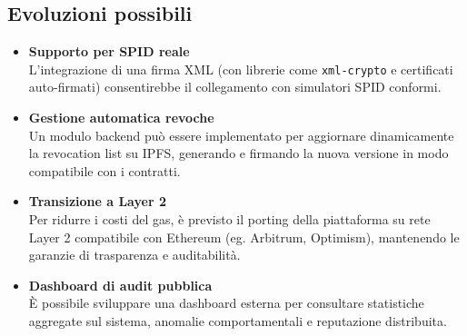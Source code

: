         \subsection{Evoluzioni possibili}
            \begin{itemize}
                \item \textbf{Supporto per SPID reale} \\
                L'integrazione di una firma XML (con librerie come \texttt{xml-crypto} e certificati auto-firmati) consentirebbe il collegamento con simulatori SPID conformi.
            
                \item \textbf{Gestione automatica revoche} \\
                Un modulo backend può essere implementato per aggiornare dinamicamente la revocation list su IPFS, generando e firmando la nuova versione in modo compatibile con i contratti.
            
                \item \textbf{Transizione a Layer 2} \\
                Per ridurre i costi del gas, è previsto il porting della piattaforma su rete Layer 2 compatibile con Ethereum (eg. Arbitrum, Optimism), mantenendo le garanzie di trasparenza e auditabilità.
            
                \item \textbf{Dashboard di audit pubblica} \\
                È possibile sviluppare una dashboard esterna per consultare statistiche aggregate sul sistema, anomalie comportamentali e reputazione distribuita.
            \end{itemize}
        
